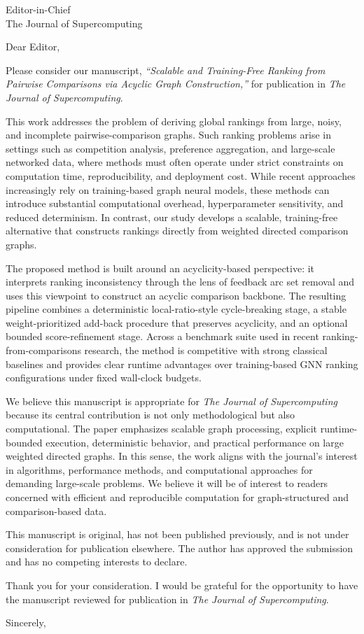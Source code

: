 \documentclass[11pt]{letter}
\begin{document}
\begin{letter}{Editor-in-Chief\\
The Journal of Supercomputing}

\opening{Dear Editor,}

Please consider our manuscript, \textit{``Scalable and Training-Free Ranking from Pairwise Comparisons via Acyclic Graph Construction,''} for publication in \textit{The Journal of Supercomputing}.

This work addresses the problem of deriving global rankings from large, noisy, and incomplete pairwise-comparison graphs. Such ranking problems arise in settings such as competition analysis, preference aggregation, and large-scale networked data, where methods must often operate under strict constraints on computation time, reproducibility, and deployment cost. While recent approaches increasingly rely on training-based graph neural models, these methods can introduce substantial computational overhead, hyperparameter sensitivity, and reduced determinism. In contrast, our study develops a scalable, training-free alternative that constructs rankings directly from weighted directed comparison graphs.

The proposed method is built around an acyclicity-based perspective: it interprets ranking inconsistency through the lens of feedback arc set removal and uses this viewpoint to construct an acyclic comparison backbone. The resulting pipeline combines a deterministic local-ratio-style cycle-breaking stage, a stable weight-prioritized add-back procedure that preserves acyclicity, and an optional bounded score-refinement stage. Across a benchmark suite used in recent ranking-from-comparisons research, the method is competitive with strong classical baselines and provides clear runtime advantages over training-based GNN ranking configurations under fixed wall-clock budgets.

We believe this manuscript is appropriate for \textit{The Journal of Supercomputing} because its central contribution is not only methodological but also computational. The paper emphasizes scalable graph processing, explicit runtime-bounded execution, deterministic behavior, and practical performance on large weighted directed graphs. In this sense, the work aligns with the journal's interest in algorithms, performance methods, and computational approaches for demanding large-scale problems. We believe it will be of interest to readers concerned with efficient and reproducible computation for graph-structured and comparison-based data.

This manuscript is original, has not been published previously, and is not under consideration for publication elsewhere. The author has approved the submission and has no competing interests to declare.

Thank you for your consideration. I would be grateful for the opportunity to have the manuscript reviewed for publication in \textit{The Journal of Supercomputing}.

\closing{Sincerely,}

\end{letter}
\end{document}
